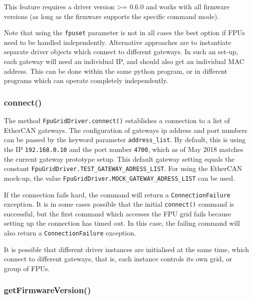 \documentclass[11pt,a4paper]{scrartcl}
\begin{document}
This feature requires a driver version >= 0.6.0 and works with all
firmware versions (as long as the firmware supports the specific
command mode).

Note that using the \texttt{fpuset} parameter is not in all cases the
best option if FPUs need to be handled independently. Alternative
approaches are to instantiate separate driver objects which connect to
different gateways. In such an set-up, each gateway will need an
individual IP, and should also get an individual MAC address. This can
be done within the same python program, or in different programs which
can operate completely independently.


\subsubsection{connect()}
\label{sec:connect}
     The method
\texttt{FpuGridDriver.connect()} establishes a connection to a list of
EtherCAN gateways. The configuration of gateways ip address and port
numbers can be passed by the keyword parameter
\texttt{address\_list}. By default, this is using the IP
\texttt{192.168.0.10} and the port number \texttt{4700}, which as of
May 2018 matches the current gateway prototype setup. This default
gateway setting equals the constant
\texttt{FpuGridDriver.TEST\_GATEWAY\_ADRESS\_LIST}.  For using the
EtherCAN mock-up, the value
\texttt{FpuGridDriver.MOCK\_GATEWAY\_ADRESS\_LIST} can be used.

If the connection fails hard, the command will return a
\texttt{ConnectionFailure} exception.  It is in some cases possible
that the initial \texttt{connect()} command is successful, but the
first command which accesses the FPU grid fails because setting up the
connection has timed out. In this case, the failing command will
also return a \texttt{ConnectionFailure} exception.

It is possible that different driver instances are initialised at the
same time, which connect to different gateways, that is, each instance
controls its own grid, or group of FPUs.

\subsubsection{getFirmwareVersion()}
\label{sec:getfirmwareversion}
\end{document}
